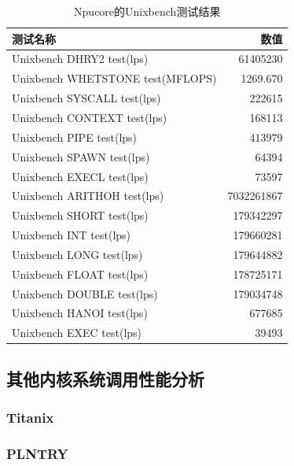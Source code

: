 \begin{table}
    \centering
    \begin{tabular}{|l|r|}
        \hline
        \textbf{测试名称} & \textbf{数值} \\
        \hline
        Unixbench DHRY2 test(lps) & 61405230 \\
        \hline
        Unixbench WHETSTONE test(MFLOPS) & 1269.670 \\
        \hline
        Unixbench SYSCALL test(lps) & 222615 \\
        \hline
        Unixbench CONTEXT test(lps) & 168113 \\
        \hline
        Unixbench PIPE test(lps) & 413979 \\
        \hline
        Unixbench SPAWN test(lps) & 64394 \\
        \hline
        Unixbench EXECL test(lps) & 73597 \\
        \hline
        Unixbench ARITHOH test(lps) & 7032261867 \\
        \hline
        Unixbench SHORT test(lps) & 179342297 \\
        \hline
        Unixbench INT test(lps) & 179660281 \\
        \hline
        Unixbench LONG test(lps) & 179644882 \\
        \hline
        Unixbench FLOAT test(lps) & 178725171 \\
        \hline
        Unixbench DOUBLE test(lps) & 179034748 \\
        \hline
        Unixbench HANOI test(lps) & 677685 \\
        \hline
        Unixbench EXEC test(lps) & 39493 \\
        \hline
    \end{tabular}
    \caption{Npucore的Unixbench测试结果}
    \label{Npucore的Unixbench测试结果}
\end{table}


\subsection{其他内核系统调用性能分析}


\subsubsection{Titanix}


\subsubsection{PLNTRY}

